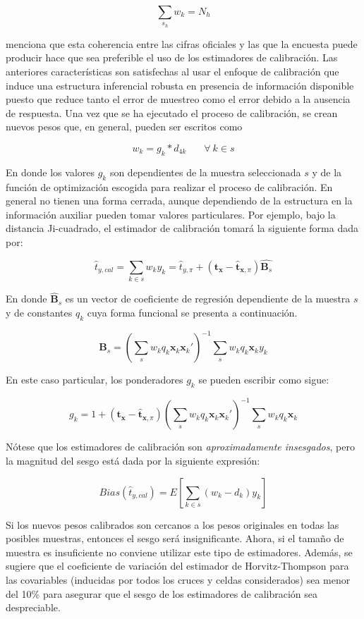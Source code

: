 \documentclass[
  12pt,
  spanish,
]{book}
\begin{document}
\[
\sum_{s_h} w_k = N_h
\]

\citet{Gutierrez_2016} menciona que esta coherencia entre las cifras oficiales y las que la encuesta puede producir hace que sea preferible el uso de los estimadores de calibración. Las anteriores características son satisfechas al usar el enfoque de calibración que induce una estructura inferencial robusta en presencia de información disponible puesto que reduce tanto el error de muestreo como el error debido a la ausencia de respuesta. Una vez que se ha ejecutado el proceso de calibración, se crean nuevos pesos que, en general, pueden ser escritos como

\[
w_k = g_k * d_{4k}  \ \ \ \ \ \ \ \ \forall \ k \in s
\]

En donde los valores \(g_k\) son dependientes de la muestra seleccionada \(s\) y de la función de optimización escogida para realizar el proceso de calibración. En general no tienen una forma cerrada, aunque dependiendo de la estructura en la información auxiliar pueden tomar valores particulares. Por ejemplo, bajo la distancia Ji-cuadrado, el estimador de calibración tomará la siguiente forma dada por:

\[
\hat{t}_{y, cal} 
= \sum_{k\in s} w_k y_k 
= \hat{t}_{y, \pi} + ( \mathbf{t_x} - \hat{\mathbf{t}}_{\mathbf{x}, \pi}) \hat{\mathbf{B}_s}
\]

En donde \(\hat{\mathbf{B}}_s\) es un vector de coeficiente de regresión dependiente de la muestra \(s\) y de constantes \(q_k\) cuya forma funcional se presenta a continuación.

\[
\hat{\mathbf{B}}_s = \left(\sum_s w_k q_k \mathbf{x}_k\mathbf{x}_k'\right)^{-1}\sum_s w_k q_k \mathbf{x}_k y_k
\]

En este caso particular, los ponderadores \(g_k\) se pueden escribir como sigue:

\[
g_k = 1 + ( \mathbf{t_x} - \hat{\mathbf{t}}_{\mathbf{x}, \pi}) \left(\sum_s w_k q_k \mathbf{x}_k\mathbf{x}_k'\right)^{-1}\sum_s w_k q_k \mathbf{x}_k
\]

Nótese que los estimadores de calibración son \emph{aproximadamente insesgados}, pero la magnitud del sesgo está dada por la siguiente expresión:

\[
Bias(\hat{t}_{y, cal}) = E\left[ \sum_{k \in s} (w_k - d_k) y_k \right]
\]

Si los nuevos pesos calibrados son cercanos a los pesos originales en todas las posibles muestras, entonces el sesgo será insignificante. Ahora, si el tamaño de muestra es insuficiente no conviene utilizar este tipo de estimadores. Además, se sugiere que el coeficiente de variación del estimador de Horvitz-Thompson para las covariables (inducidas por todos los cruces y celdas considerados) sea menor del 10\% para asegurar que el sesgo de los estimadores de calibración sea despreciable.
\end{document}
